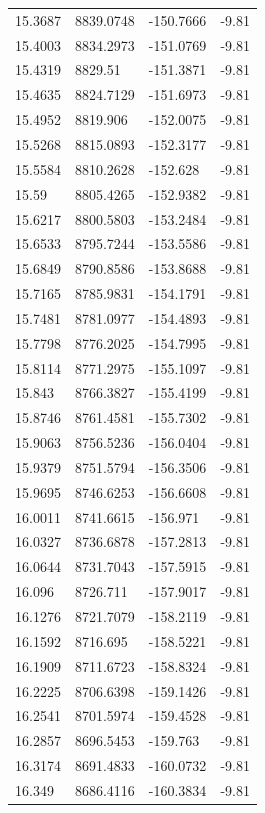 \begin{table}[H]
\begin{tabular}{llll}
15.3687 & 8839.0748 & -150.7666 & -9.81 \\
15.4003 & 8834.2973 & -151.0769 & -9.81 \\
15.4319 & 8829.51 & -151.3871 & -9.81 \\
15.4635 & 8824.7129 & -151.6973 & -9.81 \\
15.4952 & 8819.906 & -152.0075 & -9.81 \\
15.5268 & 8815.0893 & -152.3177 & -9.81 \\
15.5584 & 8810.2628 & -152.628 & -9.81 \\
15.59 & 8805.4265 & -152.9382 & -9.81 \\
15.6217 & 8800.5803 & -153.2484 & -9.81 \\
15.6533 & 8795.7244 & -153.5586 & -9.81 \\
15.6849 & 8790.8586 & -153.8688 & -9.81 \\
15.7165 & 8785.9831 & -154.1791 & -9.81 \\
15.7481 & 8781.0977 & -154.4893 & -9.81 \\
15.7798 & 8776.2025 & -154.7995 & -9.81 \\
15.8114 & 8771.2975 & -155.1097 & -9.81 \\
15.843 & 8766.3827 & -155.4199 & -9.81 \\
15.8746 & 8761.4581 & -155.7302 & -9.81 \\
15.9063 & 8756.5236 & -156.0404 & -9.81 \\
15.9379 & 8751.5794 & -156.3506 & -9.81 \\
15.9695 & 8746.6253 & -156.6608 & -9.81 \\
16.0011 & 8741.6615 & -156.971 & -9.81 \\
16.0327 & 8736.6878 & -157.2813 & -9.81 \\
16.0644 & 8731.7043 & -157.5915 & -9.81 \\
16.096 & 8726.711 & -157.9017 & -9.81 \\
16.1276 & 8721.7079 & -158.2119 & -9.81 \\
16.1592 & 8716.695 & -158.5221 & -9.81 \\
16.1909 & 8711.6723 & -158.8324 & -9.81 \\
16.2225 & 8706.6398 & -159.1426 & -9.81 \\
16.2541 & 8701.5974 & -159.4528 & -9.81 \\
16.2857 & 8696.5453 & -159.763 & -9.81 \\
16.3174 & 8691.4833 & -160.0732 & -9.81 \\
16.349 & 8686.4116 & -160.3834 & -9.81 \\

\end{tabular}
\end{table}
